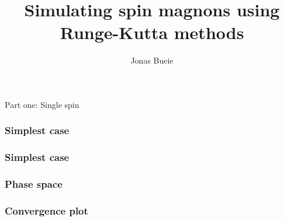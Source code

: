 \documentclass{beamer}
\title{Simulating spin magnons using Runge-Kutta methods}
\author{Jonas Bueie}
\begin{document}
\frame{\titlepage}


\begin{frame}
    \vfill
    \centering
    Part one: Single spin 
    \vfill
\end{frame}


\begin{frame}
    \frametitle{Simplest case}
\begin{figure}
    \centering
    
\end{figure}
\end{frame}
\begin{frame}
    \frametitle{Simplest case}
\begin{figure}
    \centering
    
\end{figure}
\end{frame}
\begin{frame}
    \frametitle{Phase space}
\begin{figure}
    \centering
    
\end{figure}
\end{frame}

\begin{frame}
    \frametitle{Convergence plot}
\begin{figure}[htbp]
    \centering
    
\end{figure}
\end{frame}
\end{document}
